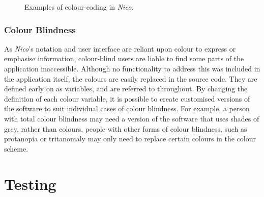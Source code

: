 \documentclass[12pt,twoside,notitlepage,xetex]{report}
\begin{document}
{\begin{center}
\begin{figure}[H]
\begin{center}
{}\hspace{2cm}
\end{center}
\caption{Examples of colour-coding in \emph{Nico}.}
\label{fig:ColourCoding}
\end{figure}
\end{center}

\subsubsection{Colour Blindness}

As \emph{Nico}'s notation and user interface are reliant upon colour to express or emphasise information, colour-blind users are liable to find some parts of the application inaccessible.  Although no functionality to address this was included in the application itself, the colours are easily replaced in the source code.  They are defined early on as variables, and are referred to throughout.  By changing the definition of each colour variable, it is possible to create customised versions of the software to suit individual cases of colour blindness.  For example, a person with total colour blindness may need a version of the software that uses shades of grey, rather than colours, people with other forms of colour blindness, such as protanopia or tritanomaly may only need to replace certain colours in the colour scheme.%

\section{Testing}

}
\end{document}
